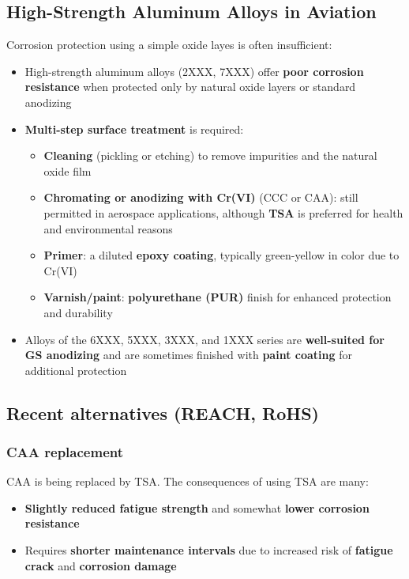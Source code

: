 \documentclass{article}
\begin{document}
\subsection{High-Strength Aluminum Alloys in Aviation}
Corrosion protection using a simple oxide layes is often insufficient:
\begin{itemize}
  \item High-strength aluminum alloys (2XXX, 7XXX) offer \textbf{poor corrosion resistance} when protected only by natural oxide layers or standard anodizing
  \item \textbf{Multi-step surface treatment} is required:
  \begin{itemize}
    \item \textbf{Cleaning} (pickling or etching) to remove impurities and the natural oxide film
    \item \textbf{Chromating or anodizing with Cr(VI)} (CCC or CAA): still permitted in aerospace applications, although \textbf{TSA} is preferred for health and environmental reasons
    \item \textbf{Primer}: a diluted \textbf{epoxy coating}, typically green-yellow in color due to Cr(VI)
    \item \textbf{Varnish/paint}: \textbf{polyurethane (PUR)} finish for enhanced protection and durability
  \end{itemize}
  \item Alloys of the 6XXX, 5XXX, 3XXX, and 1XXX series are \textbf{well-suited for GS anodizing} and are sometimes finished with \textbf{paint coating} for additional protection
\end{itemize}

\subsection{Recent alternatives (REACH, RoHS)}
\subsubsection{CAA replacement}
CAA is being replaced by TSA. The consequences of using TSA are many:
\begin{itemize}
  \item \textbf{Slightly reduced fatigue strength} and somewhat \textbf{lower corrosion resistance}
  \item Requires \textbf{shorter maintenance intervals} due to increased risk of \textbf{fatigue crack} and \textbf{corrosion damage}
\end{itemize}
\end{document}
